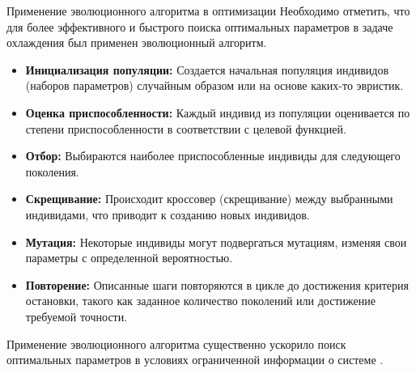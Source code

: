 \documentclass{beamer}
\begin{document}
\begin{frame}{Применение эволюционного алгоритма в оптимизации}
	Необходимо отметить, что для более эффективного и быстрого поиска оптимальных параметров в задаче охлаждения был применен эволюционный алгоритм.

	\begin{itemize}
		\item \textbf{Инициализация популяции:} Создается начальная популяция индивидов (наборов параметров) случайным образом или на основе каких-то эвристик.

		\item \textbf{Оценка приспособленности:} Каждый индивид из популяции оценивается по степени приспособленности в соответствии с целевой функцией.

		\item \textbf{Отбор:} Выбираются наиболее приспособленные индивиды для следующего поколения.

		\item \textbf{Скрещивание:} Происходит кроссовер (скрещивание) между выбранными индивидами, что приводит к созданию новых индивидов.

		\item \textbf{Мутация:} Некоторые индивиды могут подвергаться мутациям, изменяя свои параметры с определенной вероятностью.

		\item \textbf{Повторение:} Описанные шаги повторяются в цикле до достижения критерия остановки, такого как заданное количество поколений или достижение требуемой точности.
	\end{itemize}

	Применение эволюционного алгоритма существенно ускорило поиск оптимальных параметров в условиях ограниченной информации о системе \cite{evolution}.
\end{frame}
\end{document}
